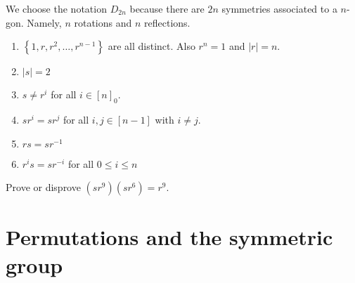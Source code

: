 \documentclass[11pt,a4paper]{article}
\begin{document}
\begin{rem}
    We choose the notation \(D_{2n}\) because there are \(2n\) symmetries associated to a \(n\)-gon. Namely, \(n\) rotations and \(n\) reflections.
\end{rem}

\begin{teo}
\begin{enumerate}[label=(\roman*)]
    \item \(\left\{ 1,r,r^2,\ldots,r^{n-1} \right\}\) are all distinct. Also  \(r^n = 1\) and \(|r| = n\).
    \item \(|s| =2\)
    \item \(s\neq r^i\) for all \(i\in [n]_0\).
    \item \(sr^i = sr^j \) for all \(i,j\in [n-1]\) with \(i\neq j\).
    \item \(rs = sr^{-1}\)
    \item \(r^i s = sr^{-i}\) for all \(0\leq i\leq n\)
\end{enumerate}
\end{teo}

\begin{eje}
    Prove or disprove \((sr^9) (sr^6) = r^9\).
\end{eje}


\section{Permutations and the symmetric group}
\end{document}

